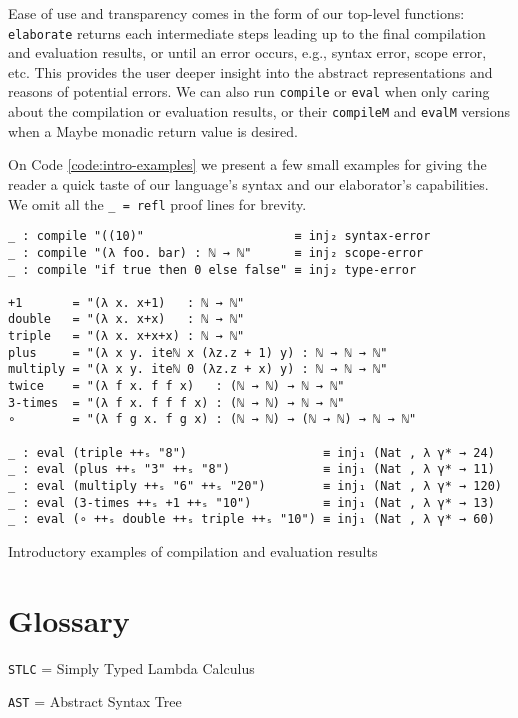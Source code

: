 Ease of use and transparency comes in the form of our top-level functions: \verb$elaborate$ returns each intermediate steps leading up to the final compilation and evaluation results, or until an error occurs, e.g., syntax error, scope error, etc. This provides the user deeper insight into the abstract representations and reasons of potential errors. We can also run \verb$compile$ or \verb$eval$ when only caring about the compilation or evaluation results, or their \verb$compileM$ and \verb$evalM$ versions when a Maybe monadic return value is desired.

On Code \ref{code:intro-examples} we present a few small examples for giving the reader a quick taste of our language's syntax and our elaborator's capabilities. We omit all the \verb$_ = refl$ proof lines for brevity.

\begin{listing}[H]
\begin{verbatim}
_ : compile "((10)"                     ≡ inj₂ syntax-error
_ : compile "(λ foo. bar) : ℕ → ℕ"      ≡ inj₂ scope-error
_ : compile "if true then 0 else false" ≡ inj₂ type-error

+1       = "(λ x. x+1)   : ℕ → ℕ"
double   = "(λ x. x+x)   : ℕ → ℕ"
triple   = "(λ x. x+x+x) : ℕ → ℕ"
plus     = "(λ x y. iteℕ x (λz.z + 1) y) : ℕ → ℕ → ℕ"
multiply = "(λ x y. iteℕ 0 (λz.z + x) y) : ℕ → ℕ → ℕ"
twice    = "(λ f x. f f x)   : (ℕ → ℕ) → ℕ → ℕ"
3-times  = "(λ f x. f f f x) : (ℕ → ℕ) → ℕ → ℕ"
∘        = "(λ f g x. f g x) : (ℕ → ℕ) → (ℕ → ℕ) → ℕ → ℕ"

_ : eval (triple ++ₛ "8")                   ≡ inj₁ (Nat , λ γ* → 24)
_ : eval (plus ++ₛ "3" ++ₛ "8")             ≡ inj₁ (Nat , λ γ* → 11)
_ : eval (multiply ++ₛ "6" ++ₛ "20")        ≡ inj₁ (Nat , λ γ* → 120)
_ : eval (3-times ++ₛ +1 ++ₛ "10")          ≡ inj₁ (Nat , λ γ* → 13)
_ : eval (∘ ++ₛ double ++ₛ triple ++ₛ "10") ≡ inj₁ (Nat , λ γ* → 60)
\end{verbatim}
\caption{Introductory examples of compilation and evaluation results}
\label{code:intro-examples}
\end{listing}

\newpage

\section{Glossary}

\verb$STLC$ = Simply Typed Lambda Calculus

\verb$AST$ = Abstract Syntax Tree

